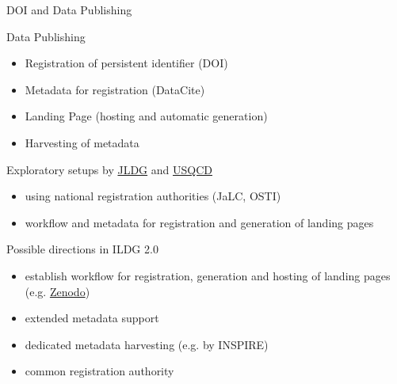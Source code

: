\documentclass[aspectratio=169,xcolor=dvipsnames]{beamer}
\begin{document}
\begin{frame}{DOI and Data Publishing}
  \begin{block}{Data Publishing}
    \begin{itemize}
    \item Registration of persistent identifier (DOI)
    \item Metadata for registration (DataCite)
    \item Landing Page (hosting and automatic generation)
    \item Harvesting of metadata
    \end{itemize}
  \end{block}

  Exploratory setups by \href{https://www.jldg.org/DOI}{JLDG} and
  \href{https://www.osti.gov/dataexplorer/search/product-type:Dataset/semantic:Lattice QCD}{USQCD}
  \begin{itemize}
  \item using national registration authorities (JaLC, OSTI)
  \item workflow and metadata for registration and generation of landing pages
  \end{itemize}

  Possible directions in ILDG 2.0
  \begin{itemize}
  \item establish workflow for registration, generation and hosting of landing pages
    (e.g. \href{https://zenodo.org/communities/ildg}{Zenodo})
  \item extended metadata support
  \item dedicated metadata harvesting (e.g. by INSPIRE)
  \item common registration authority
  \end{itemize}
  
\end{frame}
    
\end{document}
